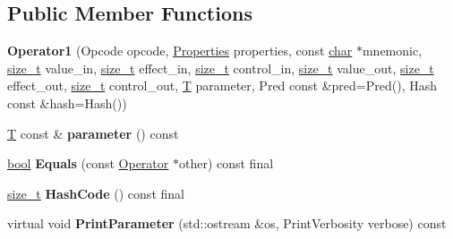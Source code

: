 \subsection*{Public Member Functions}
\begin{DoxyCompactItemize}
\item 
\mbox{\label{classv8_1_1internal_1_1compiler_1_1Operator1_aafab80cb37b87170d3cdedf011fe3869}} 
{\bfseries Operator1} (Opcode opcode, \mbox{\hyperlink{classv8_1_1base_1_1Flags}{Properties}} properties, const \mbox{\hyperlink{classchar}{char}} $\ast$mnemonic, \mbox{\hyperlink{classsize__t}{size\+\_\+t}} value\+\_\+in, \mbox{\hyperlink{classsize__t}{size\+\_\+t}} effect\+\_\+in, \mbox{\hyperlink{classsize__t}{size\+\_\+t}} control\+\_\+in, \mbox{\hyperlink{classsize__t}{size\+\_\+t}} value\+\_\+out, \mbox{\hyperlink{classsize__t}{size\+\_\+t}} effect\+\_\+out, \mbox{\hyperlink{classsize__t}{size\+\_\+t}} control\+\_\+out, \mbox{\hyperlink{classv8_1_1internal_1_1torque_1_1T}{T}} parameter, Pred const \&pred=Pred(), Hash const \&hash=Hash())
\item 
\mbox{\label{classv8_1_1internal_1_1compiler_1_1Operator1_ab00748a1ed90fc181e7d178e47584037}} 
\mbox{\hyperlink{classv8_1_1internal_1_1torque_1_1T}{T}} const  \& {\bfseries parameter} () const
\item 
\mbox{\label{classv8_1_1internal_1_1compiler_1_1Operator1_af6ab2a2957d6747d7f5e528393a5227a}} 
\mbox{\hyperlink{classbool}{bool}} {\bfseries Equals} (const \mbox{\hyperlink{classv8_1_1internal_1_1compiler_1_1Operator}{Operator}} $\ast$other) const final
\item 
\mbox{\label{classv8_1_1internal_1_1compiler_1_1Operator1_a6faec59241b6e11c59c4674b22bc27d1}} 
\mbox{\hyperlink{classsize__t}{size\+\_\+t}} {\bfseries Hash\+Code} () const final
\item 
\mbox{\label{classv8_1_1internal_1_1compiler_1_1Operator1_a4fb3974a51abcc38c70b8b159c86efac}} 
virtual void {\bfseries Print\+Parameter} (std\+::ostream \&os, Print\+Verbosity verbose) const
\item 
\mbox{\label{classv8_1_1internal_1_1compiler_1_1Operator1_a5d59959725087e6320c5493c21f6ff5c}} 

\end{DoxyCompactItemize}

